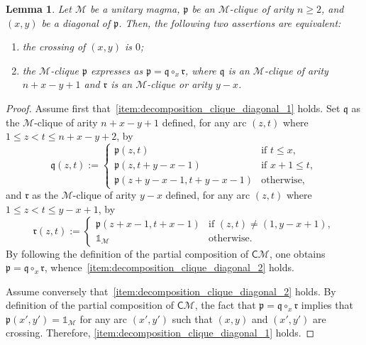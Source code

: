 \documentclass[10pt,reqno]{amsart}
\numberwithin{equation}{subsection}
\renewcommand{\leq}{\leqslant}
\renewcommand{\geq}{\geqslant}
\newtheorem{Lemma}[Theorem]{Lemma}
\newcommand{\Mca}{\mathcal{M}}
\newcommand{\Pfr}{\mathfrak{p}}
\newcommand{\Qfr}{\mathfrak{q}}
\newcommand{\Rfr}{\mathfrak{r}}
\newcommand{\Cli}{\mathsf{C}}
\newcommand{\Unit}{\mathds{1}}
\begin{document}
\begin{Lemma} \label{lem:decomposition_clique_diagonal}
    Let $\Mca$ be a unitary magma, $\Pfr$ be an $\Mca$-clique of arity
    $n \geq 2$, and $(x, y)$ be a diagonal of $\Pfr$. Then, the
    following two assertions are equivalent:
    \begin{enumerate}[fullwidth,label={(\it\roman*)}]
        \item \label{item:decomposition_clique_diagonal_1}
        the crossing of $(x, y)$ is $0$;
        \item \label{item:decomposition_clique_diagonal_2}
        the $\Mca$-clique $\Pfr$ expresses as $\Pfr = \Qfr \circ_x \Rfr$,
        where $\Qfr$ is an $\Mca$-clique of arity $n + x - y + 1$ and
        $\Rfr$ is an $\Mca$-clique or arity $y - x$.
    \end{enumerate}
\end{Lemma}
\begin{proof}
    Assume first that~\ref{item:decomposition_clique_diagonal_1} holds.
    Set $\Qfr$ as the $\Mca$-clique of arity $n + x - y + 1$ defined,
    for any arc $(z, t)$ where $1 \leq z < t \leq n + x - y + 2$, by
    \begin{equation}
        \Qfr(z, t) :=
        \begin{cases}
            \Pfr(z, t) & \mbox{if } t \leq x, \\
            \Pfr(z, t + y - x - 1) & \mbox{if } x + 1 \leq t, \\
            \Pfr(z + y - x - 1, t + y - x - 1) & \mbox{otherwise},
        \end{cases}
    \end{equation}
    and $\Rfr$ as the $\Mca$-clique of arity $y - x$ defined, for any
    arc $(z, t)$ where $1 \leq z < t \leq y - x + 1$, by
    \begin{equation}
        \Rfr(z, t) :=
        \begin{cases}
            \Pfr(z + x - 1, t + x - 1)
                & \mbox{if } (z, t) \ne (1, y - x + 1), \\
            \Unit_\Mca & \mbox{otherwise}.
        \end{cases}
    \end{equation}
    By following the definition of the partial composition of
    $\Cli\Mca$, one obtains $\Pfr = \Qfr \circ_x \Rfr$,
    whence~\ref{item:decomposition_clique_diagonal_2} holds.
    \smallskip

    Assume conversely that~\ref{item:decomposition_clique_diagonal_2}
    holds. By definition of the partial composition of $\Cli\Mca$, the
    fact that $\Pfr = \Qfr \circ_x \Rfr$ implies that
    $\Pfr(x', y') = \Unit_\Mca$ for any arc $(x', y')$ such that
    $(x, y)$ and $(x', y')$ are crossing. Therefore,
    \ref{item:decomposition_clique_diagonal_1} holds.
\end{proof}
\medskip
\end{document}
